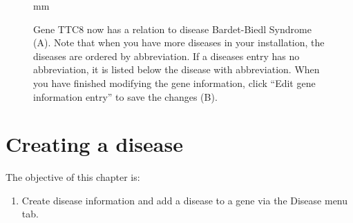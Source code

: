 \begin{figure}[ht]
  \begin{shaded}
		 mm
	  \caption{Gene TTC8 now has a relation to disease Bardet-Biedl Syndrome (A). \newline
	  Note that when you have more diseases in your installation, the diseases are ordered by abbreviation.
	  If a diseases entry has no abbreviation, it is listed below the disease with abbreviation. \newline
		When you have finished modifying the gene information, 
		 click ``Edit gene information entry'' to save the changes (B).}
		\label{fig:edit_gene_V}
  \end{shaded}
\end{figure}

\chapter{Creating a disease}
\label{chap:create_disease}
The objective of this chapter is:
\begin{enumerate}
	\item 
	Create disease information and add a disease to a gene via the Disease menu tab.
\end{enumerate}

